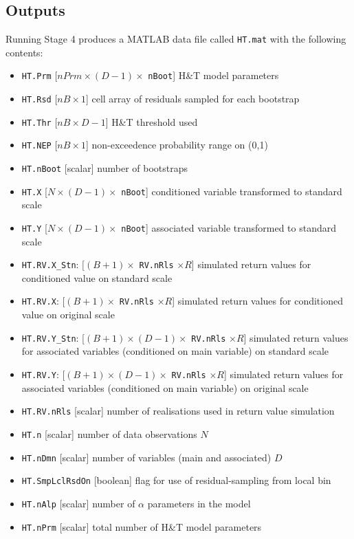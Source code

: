 \subsection{Outputs}
Running Stage 4 produces a MATLAB data file called \verb|HT.mat| with the following contents:
\begin{itemize}
	\item \verb|HT.Prm| [$nPrm \times (D-1) \times$ \verb|nBoot|] H\&T model parameters
	\item \verb|HT.Rsd| [$nB  \times  1$] cell array of residuals sampled for each bootstrap
	\item \verb|HT.Thr| [$nB  \times  D-1$] H\&T threshold used
	\item \verb|HT.NEP|  [$nB  \times  1$] non-exceedence probability range on (0,1)
	\item \verb|HT.nBoot| [scalar] number of bootstraps
	\item \verb|HT.X| [$N \times (D-1)  \times$ \verb|nBoot|] conditioned variable transformed to standard scale
	\item \verb|HT.Y| [$N \times (D-1)  \times$ \verb|nBoot|] associated variable transformed to standard scale
	\item \verb|HT.RV.X_Stn|: $[(B+1 )\times $ \verb|RV.nRls| $ \times R$] simulated return values for conditioned value on standard scale
	\item \verb|HT.RV.X|: [$(B +1 )\times $ \verb|RV.nRls| $ \times R$]   simulated return values for conditioned value on original scale	
	\item \verb|HT.RV.Y_Stn|: [$(B +1 )\times (D-1)\times$ \verb|RV.nRls| $ \times R$] simulated return values for associated variables (conditioned on main variable) on standard scale
	\item \verb|HT.RV.Y|: [$(B +1 )\times (D-1)\times $ \verb|RV.nRls| $ \times R$] simulated return values for associated variables (conditioned on main variable) on original scale
	\item \verb|HT.RV.nRls| [scalar] number of realisations used in return value simulation
	\item \verb|HT.n| [scalar] number of data observations $N$
	\item \verb|HT.nDmn| [scalar] number of variables (main and associated) $D$
	\item \verb|HT.SmpLclRsdOn| [boolean] flag for use of residual-sampling from local bin
	\item \verb|HT.nAlp|  [scalar] number of $\alpha$ parameters in the model
	\item \verb|HT.nPrm| [scalar] total number of H\&T model parameters

\end{itemize}

